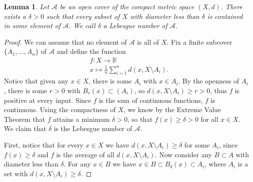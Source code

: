 \documentclass{report}
\newtheorem{lemma}{Lemma}[section]
\theoremstyle{definition}
\theoremstyle{remark}
\newcommand{\R}{\mathbb{R}}
\newcommand{\set}[1]{\{#1\}}
\newcommand{\prt}[1]{\mathcal{#1}}
\begin{document}
\begin{lemma}
    Let $\prt{A}$ be an open cover of the compact metric space $(X, d)$. There exists a $\delta > 0$ such that every subset of $X$ with diameter less than $\delta$ is contained in some element of $\prt{A}$. We call $\delta$ a Lebesgue number of $\prt{A}$.
\end{lemma}

\begin{proof}
    We can assume that no element of $\prt{A}$ is all of $X$. Fix a finite subcover $\set{A_1, \dots, A_n}$ of $\prt{A}$ and define the function 
    \begin{align*}
        &f : X \to \R \\
        &x \mapsto \frac{1}{n} \sum_{i=1}^n d(x, X \setminus A_i).
    \end{align*} Notice that given any  $x \in X$, there is some $A_i$ with $x \in A_i$. By the openness of $A_i$, there is some $r > 0$ with $B_r(x) \subset (A_i)$, so $d(x, X \setminus A_i) \geq r > 0$, thus $f$ is positive at every input. Since $f$ is the sum of continuous functions, $f$ is continuous. Using the compactness of $X$, we know by the Extreme Value Theorem that $f$ attains a minimum $\delta > 0$, so that $f(x) \geq \delta > 0$ for all $x \in X$. We claim that $\delta$ is the Lebesgue number of $\prt{A}$.
    
    First, notice that for every $x \in X$ we have $d(x, X \setminus A_i) \geq \delta$ for some $A_i$, since $f(x) \geq \delta$ and $f$ is the average of all $d(x, X \setminus A_i)$. Now consider any $B \subset A$ with diameter less than $\delta$. For any $x \in B$ we have $x \in B \subset B_\delta(x) \subset A_i$, where $A_i$ is a set with $d(x, X \setminus A_i) \geq \delta$.
\end{proof}
\end{document}
